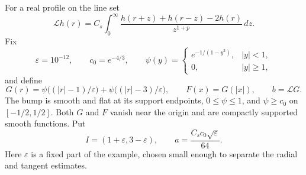 \documentclass[11pt]{article}
\newcommand{\Lop}{\mathcal L}
\begin{document}
For a real profile on the line set
\[
 \Lop h(r)=C_s\int_0^\infty
 \frac{h(r+z)+h(r-z)-2h(r)}{z^{1+p}}\,dz.
\]
Fix
\[
 \varepsilon=10^{-12},\qquad c_0=e^{-4/3},\qquad
 \psi(y)=\begin{cases}e^{-1/(1-y^2)},&|y|<1,\\0,&|y|\ge1,\end{cases}
\]
and define
\begin{equation}\label{eq:profiles}
 G(r)=\psi\bigl((|r|-1)/\varepsilon\bigr)
      +\psi\bigl((|r|-3)/\varepsilon\bigr),\qquad
 F(x)=G(|x|),\qquad b=\Lop G.
\end{equation}
The bump is smooth and flat at its support endpoints, $0\le\psi\le1$, and
$\psi\ge c_0$ on $[-1/2,1/2]$. Both $G$ and $F$ vanish near the origin
and are compactly supported smooth functions. Put
\[
 I=(1+\varepsilon,3-\varepsilon),\qquad
 a=\frac{C_s c_0\sqrt\varepsilon}{64}.
\]
Here $\varepsilon$ is a fixed part of the example, chosen small enough to
separate the radial and tangent estimates.
\end{document}
